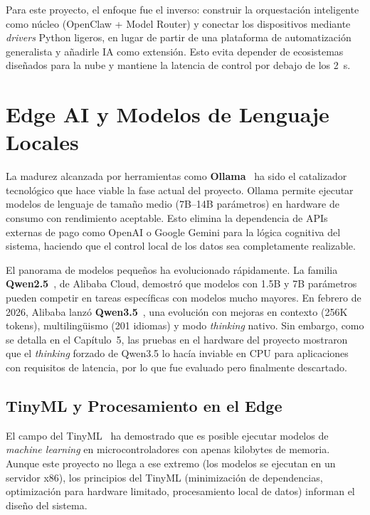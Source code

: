 Para este proyecto, el enfoque fue el inverso: construir la orquestación inteligente como núcleo (OpenClaw + Model Router) y conectar los dispositivos mediante \textit{drivers} Python ligeros, en lugar de partir de una plataforma de automatización generalista y añadirle IA como extensión. Esto evita depender de ecosistemas diseñados para la nube y mantiene la latencia de control por debajo de los 2~s.

\section{Edge AI y Modelos de Lenguaje Locales}

La madurez alcanzada por herramientas como \textbf{Ollama}~\cite{ollama} ha sido el catalizador tecnológico que hace viable la fase actual del proyecto. Ollama permite ejecutar modelos de lenguaje de tamaño medio (7B--14B parámetros) en hardware de consumo con rendimiento aceptable. Esto elimina la dependencia de APIs externas de pago como OpenAI o Google Gemini para la lógica cognitiva del sistema, haciendo que el control local de los datos sea completamente realizable.

El panorama de modelos pequeños ha evolucionado rápidamente. La familia \textbf{Qwen2.5}~\cite{hui_qwen25_coder_2024}, de Alibaba Cloud, demostró que modelos con 1.5B y 7B parámetros pueden competir en tareas específicas con modelos mucho mayores. En febrero de 2026, Alibaba lanzó \textbf{Qwen3.5}~\cite{qwen3_5}, una evolución con mejoras en contexto (256K tokens), multilingüismo (201 idiomas) y modo \textit{thinking} nativo. Sin embargo, como se detalla en el Capítulo~5, las pruebas en el hardware del proyecto mostraron que el \textit{thinking} forzado de Qwen3.5 lo hacía inviable en CPU para aplicaciones con requisitos de latencia, por lo que fue evaluado pero finalmente descartado.

\subsection{TinyML y Procesamiento en el Edge}

El campo del TinyML~\cite{kallimani_tinyml_2023} ha demostrado que es posible ejecutar modelos de \textit{machine learning} en microcontroladores con apenas kilobytes de memoria. Aunque este proyecto no llega a ese extremo (los modelos se ejecutan en un servidor x86), los principios del TinyML (minimización de dependencias, optimización para hardware limitado, procesamiento local de datos) informan el diseño del sistema.

